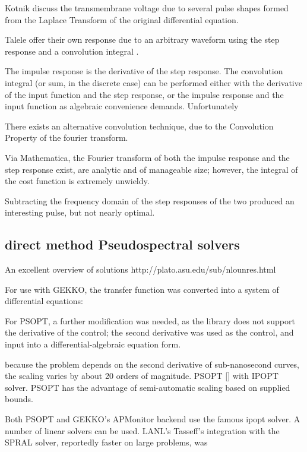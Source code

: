\documentclass[fleqn,10pt]{paper}
\begin{document}
Kotnik discuss the transmembrane voltage due to several pulse shapes formed from the Laplace Transform of the original differential equation. 



Talele offer their own response due to an arbitrary waveform using the step response and a convolution integral \cite{Nonlinear2007}.

The impulse response is the derivative of the step response. The convolution integral (or sum, in the discrete case) can be performed either with the derivative of the input function and the step response, or the impulse response and the input function as algebraic convenience demands. Unfortunately

There exists an alternative convolution technique, due to the Convolution Property of the fourier transform.

Via Mathematica, the Fourier transform of both the impulse response and the step response exist, are analytic and of manageable size; however, the integral of the cost function is extremely unwieldy.

Subtracting the frequency domain of the step responses of the two produced an interesting pulse, but not nearly optimal.



\subsection*{direct method Pseudospectral solvers}

An excellent overview of solutions http://plato.asu.edu/sub/nlounres.html

For use with GEKKO, the transfer function was converted into a system of differential equations:

For PSOPT, a further modification was needed, as the library does not support the derivative of the control; the second derivative was used as the control, and input into a differential-algebraic equation form.



because the problem depends on the second derivative of sub-nanosecond curves, the scaling varies by about 20 orders of magnitude.
PSOPT [] with IPOPT\cite{implementation2006} solver. PSOPT has the advantage of semi-automatic scaling based on supplied bounds. 

Both PSOPT and GEKKO's APMonitor backend use the famous ipopt solver. A number of linear solvers can be used. LANL's Tasseff's integration with the SPRAL solver, reportedly faster on large problems, was 
\end{document}
